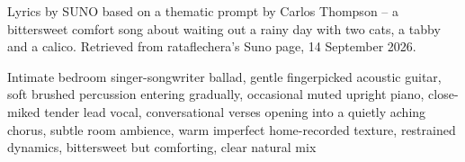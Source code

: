 
\begin{notes}
Lyrics by SUNO based on a thematic prompt by Carlos Thompson -- a bittersweet comfort song about waiting out a rainy day with two cats, a tabby and a calico. Retrieved from rataflechera's Suno page, 14 September 2026.
\end{notes}
\begin{style}
Intimate bedroom singer-songwriter ballad, gentle fingerpicked acoustic guitar, soft brushed percussion entering gradually, occasional muted upright piano, close-miked tender lead vocal, conversational verses opening into a quietly aching chorus, subtle room ambience, warm imperfect home-recorded texture, restrained dynamics, bittersweet but comforting, clear natural mix
\end{style}
